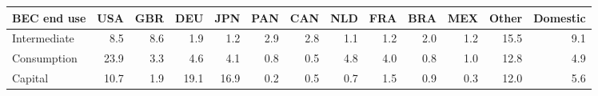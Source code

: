 \begin{tabular}{lrrrrrrrrrrrr}
\toprule
BEC end use & USA & GBR & DEU & JPN & PAN & CAN & NLD & FRA & BRA & MEX & Other & Domestic \\
\midrule
Intermediate & 8.5 & 8.6 & 1.9 & 1.2 & 2.9 & 2.8 & 1.1 & 1.2 & 2.0 & 1.2 & 15.5 & 9.1 \\
Consumption & 23.9 & 3.3 & 4.6 & 4.1 & 0.8 & 0.5 & 4.8 & 4.0 & 0.8 & 1.0 & 12.8 & 4.9 \\
Capital & 10.7 & 1.9 & 19.1 & 16.9 & 0.2 & 0.5 & 0.7 & 1.5 & 0.9 & 0.3 & 12.0 & 5.6 \\
\bottomrule
\end{tabular}
